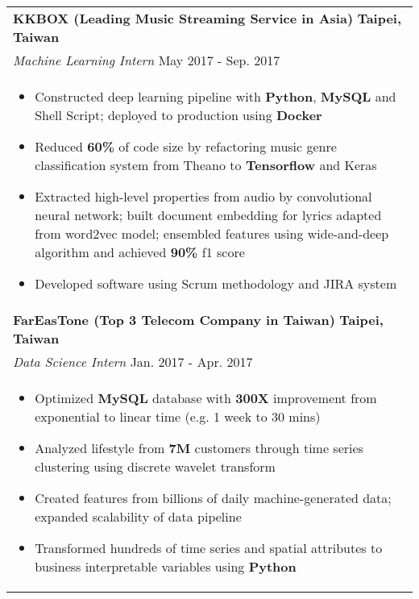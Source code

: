 \documentclass[letterpaper,11pt]{article} %
\begin{document}
{\begin{tabular}{p{18.5cm}}
{\bf{KKBOX (Leading Music Streaming Service in Asia)}} \hfill \bf{Taipei, Taiwan}\\
{\it Machine Learning Intern} \hfill  May 2017 - Sep. 2017\\%
\begin{itemize}
\vspace{-3mm}
\item Constructed deep learning pipeline with {\bf Python}, {\bf MySQL} and Shell Script; deployed to production using {\bf Docker}
\item Reduced {\bf 60\%} of code size by refactoring music genre classification system from Theano to {\bf Tensorflow} and Keras 
\item Extracted high-level properties from audio by convolutional neural network; built document embedding for lyrics adapted from word2vec model; ensembled features using wide-and-deep algorithm and achieved {\bf 90\%} f1 score 
\item Developed software using Scrum methodology and JIRA system \vspace*{-\baselineskip}
\end{itemize} \\ 
\vspace{.1mm}

{\bf{FarEasTone (Top 3 Telecom Company in Taiwan)}} \hfill \bf{Taipei, Taiwan}\\
{\it Data Science Intern} \hfill  Jan. 2017 - Apr. 2017\\%
\begin{itemize}
\vspace{-3mm}
\item Optimized {\bf MySQL} database with {\bf300X} improvement from exponential to linear time (e.g. 1 week to 30 mins) 
\item Analyzed lifestyle from {\bf 7M} customers through time series clustering using discrete wavelet transform
\item Created features from billions of daily machine-generated data; expanded scalability of data pipeline 
\item Transformed hundreds of time series and spatial attributes to business interpretable variables using {\bf Python}
\vspace*{-\baselineskip}
\end{itemize} 
\vspace{.1mm}
\end{tabular}

}
\end{document}
